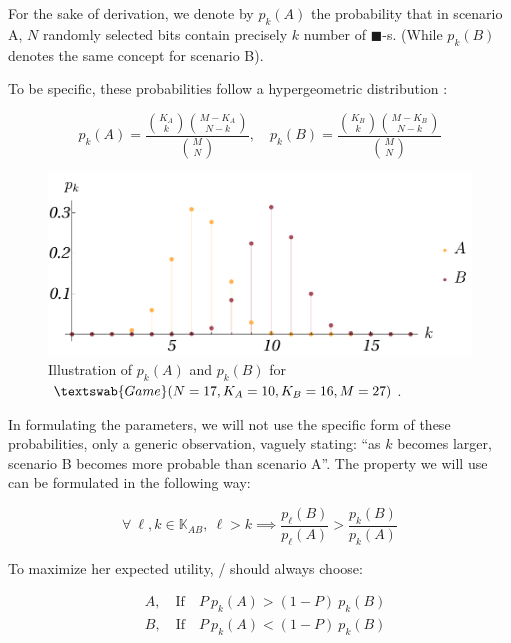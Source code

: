 \documentclass{article}
\newcommand{\bb}{\blacksquare}
\theoremstyle{definition}
\newcommand{\G}[1]{$\textswab{Game}(#1)$}
\begin{document}
For the sake of derivation, we denote by $p_k(A)$ the probability that in scenario A, $N$ randomly selected bits contain precisely $k$ number of $\bb$-s. (While $p_k(B)$ denotes the same concept for scenario B).

To be specific, these probabilities follow a hypergeometric distribution \cite{book:IntroToProbability, book:StatisticalInference, book:Renyi1970}:

\begin{equation}
    p_k(A) = \frac{\binom{K_A}{k} \binom{M-K_A}{N-k}}{\binom{M}{N}}, \quad
    p_k(B) = \frac{\binom{K_B}{k} \binom{M-K_B}{N-k}}{\binom{M}{N}}
\end{equation}


\begin{figure}[H]
    \centering
    \includegraphics[scale=0.8]{img/pkAB17_10_16_27.pdf}
    \caption{Illustration of $p_k(A)$ and $p_k(B)$ for \G{N=17,K_A=10,K_B=16,M=27}.}
    \label{fig:pkAB}
\end{figure}


In formulating the parameters, we will not use the specific form of these probabilities, only a generic observation, vaguely stating: ``as $k$ becomes larger, scenario B becomes more probable than scenario A''. The property we will use can be formulated in the following way:

\begin{equation}
    \forall \ \ell, k \in \mathbb{K}_{AB}, \ \ell > k \implies \frac{p_\ell(B)}{p_\ell(A)} > \frac{p_k(B)}{p_k(A)}
\end{equation}

To maximize her expected utility, \PI/ should always choose:

\begin{equation}
    \begin{split}
        & A,\quad \mathrm{If} \quad P \ p_k(A) > (1-P) \ p_k(B) \\
        & B,\quad \mathrm{If} \quad P \ p_k(A) < (1-P) \ p_k(B)
    \end{split}
\end{equation}
\end{document}
